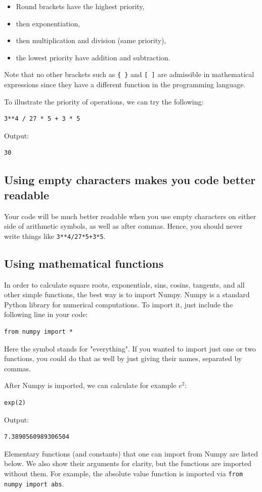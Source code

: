 \begin{itemize} 
\item Round brackets have the highest priority,
\item then exponentiation, 
\item then multiplication and division (same priority),
\item the lowest priority have addition and subtraction.
\end{itemize}
Note that no other brackets such as {\tt \{ \}} and {\tt [ ]} are 
admissible in mathematical expressions since they have a different 
function in the programming language.

To illustrate the priority of operations, we can try the following:

\begin{verbatim}
3**4 / 27 * 5 + 3 * 5
\end{verbatim}
Output:

\begin{verbatim}
30
\end{verbatim}
\subsection{Using empty characters makes you code better readable}
Your code will be much better readable when you use empty
characters on either side of arithmetic symbols, as well as 
after commas. Hence, you should never write things like {\tt 3**4/27*5+3*5}.

\subsection{Using mathematical functions}

In order to calculate square roots, exponentials, sins, cosins, tangents, and all other 
simple functions, the best way is to import Numpy. Numpy is a standard Python library 
for numerical computations. To import it, just include the following 
line in your code:

\begin{verbatim}
from numpy import *
\end{verbatim}
Here the symbol {\tt *} stands for "everything". If you wanted to import just one or two 
functions, you could do that as well by just giving their names, separated by commas. 

After Numpy is imported, we can calculate for example $e^2$:

\begin{verbatim}
exp(2)
\end{verbatim}
Output:
\begin{verbatim}
7.3890560989306504
\end{verbatim}
Elementary functions (and constants) that one can import from Numpy are listed
below. We also show their arguments for clarity, but the functions are imported without 
them. For example, the absolute value function is imported via {\tt from numpy import abs}.\\

